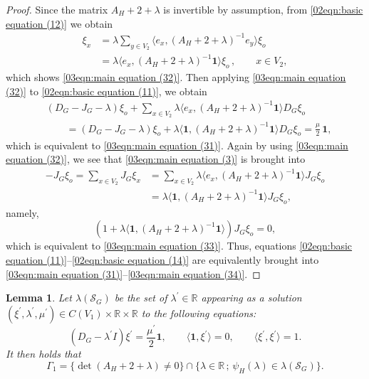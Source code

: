 \documentclass[12pt,a4paper]{article}
\newtheorem{lemma}[theorem]{Lemma}
\newcommand{\1}{{\bm 1}}
\numberwithin{equation}{section}
\begin{document}
\begin{proof}
Since the matrix $A_H+2+\lambda$ is invertible by assumption,
from \eqref{02eqn:basic equation (12)} we obtain
\begin{align*}
\xi_x
&=\lambda \sum_{y\in V_2} 
 \langle e_x, (A_H+2+\lambda)^{-1}e_y\rangle\xi_o
\\
&=\lambda \langle e_x, (A_H+2+\lambda)^{-1}\mathbf{1}\rangle\xi_o\,,
\qquad x\in V_2,
\end{align*}
%
which shows \eqref{03eqn:main equation (32)}.
Then applying \eqref{03eqn:main equation (32)} to
\eqref{02eqn:basic equation (11)}, we obtain
%
\begin{align*}
&(D_G-J_G-\lambda)\xi_o 
 +\sum_{x\in V_2}
 \lambda \langle e_x, (A_H+2+\lambda)^{-1}\mathbf{1}\rangle D_G\xi_o
\\
&\qquad =(D_G-J_G-\lambda)\xi_o 
 +\lambda \langle\mathbf{1},
 (A_H+2+\lambda)^{-1}\mathbf{1}\rangle D_G\xi_o
=\frac{\mu}{2}\,\mathbf{1},
\end{align*}
which is equivalent to \eqref{03eqn:main equation (31)}.
Again by using \eqref{03eqn:main equation (32)},
we see that \eqref{03eqn:main equation (3)} is brought into
\begin{align*}
-J_G\xi_o
=\sum_{x\in V_2} J_G\xi_x
&=\sum_{x\in V_2}  \lambda 
 \langle e_x, (A_H+2+\lambda)^{-1}\mathbf{1}\rangle J_G\xi_o
\\
&=\lambda 
  \langle \mathbf{1}, (A_H+2+\lambda)^{-1}\mathbf{1}\rangle J_G\xi_o,
\end{align*}
namely,
\[
(1+\lambda \langle \mathbf{1}, (A_H+2+\lambda)^{-1}\mathbf{1}\rangle)
J_G\xi_o=0,
\]
which is equivalent to \eqref{03eqn:main equation (33)}.
Thus, equations
\eqref{02eqn:basic equation (11)}--\eqref{02eqn:basic equation (14)}
are equivalently brought into 
\eqref{03eqn:main equation (31)}--\eqref{03eqn:main equation (34)}.
\end{proof}

\begin{lemma}\label{03lem:description Gamma2}
Let $\lambda(\mathcal{S}_G)$ be the set of
$\lambda^\prime\in\mathbb{R}$ appearing as a 
solution $(\xi^\prime,\lambda^\prime,\mu^\prime)
\in C(V_1)\times \mathbb{R}\times \mathbb{R}$
to the following equations:
\begin{equation}\label{03eqn:for S(G)}
(D_G-\lambda^\prime I)\xi^\prime=\frac{\mu^\prime}{2}\mathbf{1},
\qquad
\langle \mathbf{1},\xi^\prime\rangle=0,
\qquad
\langle \xi^\prime,\xi^\prime\rangle=1.
\end{equation}
%
It then holds that
\begin{equation}\label{03eqn:description Gamma2}
\Gamma_1
=\{\det(A_H+2+\lambda)\neq0\}
 \cap\{\lambda\in\mathbb{R}\,;\,
  \psi_H(\lambda)\in \lambda(\mathcal{S}_G)\}.
\end{equation}
\end{lemma}
\end{document}
